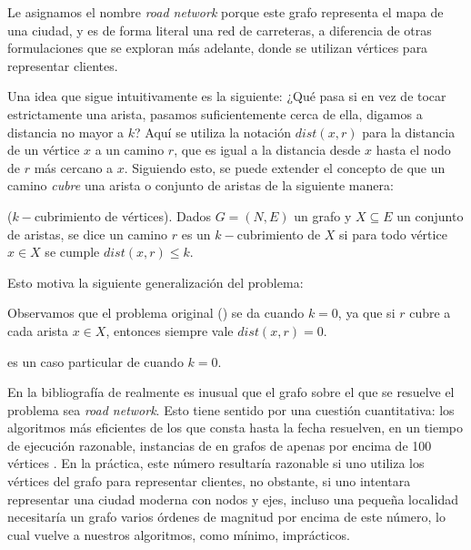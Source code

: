 
Le asignamos el nombre \emph{road network} porque este grafo representa el mapa de una ciudad, y es de forma literal una red de carreteras, a diferencia de otras formulaciones que se exploran más adelante, donde se utilizan vértices para representar clientes.

Una idea que sigue intuitivamente es la siguiente: ¿Qué pasa si en vez de tocar estrictamente una arista, pasamos suficientemente cerca de ella, digamos a distancia no mayor a $k$? Aquí se utiliza la notación $dist(x, r)$ para la distancia de un vértice $x$ a un camino $r$, que es igual a la distancia desde $x$ hasta el nodo de $r$ más cercano a $x$. Siguiendo esto, se puede extender el concepto de que un camino \emph{cubre} una arista o conjunto de aristas de la siguiente manera:

\begin{definition}
($k-$cubrimiento de vértices).
Dados $G = (N, E)$ un grafo y $X \subseteq E$ un conjunto de aristas, se dice un camino $r$ es un $k-$cubrimiento de $X$ si para todo vértice $x \in X$ se cumple $dist(x, r) \leq k$. 
\end{definition}

Esto motiva la siguiente generalización del problema:


Observamos que el problema original () se da cuando $k=0$, ya que si $r$ cubre a cada arista $x \in X$, entonces siempre vale $dist(x, r) = 0$. 

\begin{observation}
 es un caso particular de  cuando $k=0$.
\end{observation}

En la bibliografía de  realmente es inusual que el grafo sobre el que se resuelve el problema sea \emph{road network}. Esto tiene sentido por una cuestión cuantitativa: los algoritmos más eficientes de los que consta hasta la fecha resuelven, en un tiempo de ejecución razonable, instancias de  en grafos de apenas por encima de 100 vértices \cite{laporte}. En la práctica, este número resultaría razonable si uno utiliza los vértices del grafo para representar clientes, no obstante, si uno intentara representar una ciudad moderna con nodos y ejes, incluso una pequeña localidad necesitaría un grafo varios órdenes de magnitud por encima de este número, lo cual vuelve a nuestros algoritmos, como mínimo, imprácticos.
 
